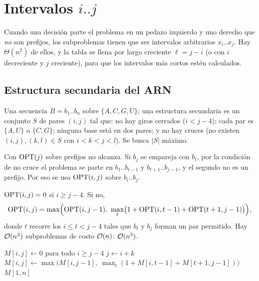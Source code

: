 \section{\texorpdfstring{Intervalos $i..j$}{Intervalos i..j}}\label{pd:sec:intervalos}

Cuando una decisión parte el problema en un pedazo izquierdo y uno derecho
que \emph{no} son prefijos, los subproblemas tienen que ser intervalos
arbitrarios $x_i..x_j$. Hay $\Theta(n^2)$ de ellos, y la tabla se llena por
largo creciente $\ell=j-i$ (o con $i$ decreciente y $j$ creciente), para que
los intervalos más cortos estén calculados.

\subsection{Estructura secundaria del ARN}

Una secuencia $B=b_1..b_n$ sobre $\{A,C,G,U\}$; una estructura secundaria es
un conjunto $S$ de pares $(i,j)$ tal que: no hay giros cerrados ($i<j-4$);
cada par es $\{A,U\}$ o $\{C,G\}$; ninguna base está en dos pares; y no hay
cruces (no existen $(i,j),(k,l)\in S$ con $i<k<j<l$). Se busca $|S|$
máximo.

Con $\mathrm{OPT}(j)$ sobre prefijos no alcanza. Si $b_j$ se empareja con $b_t$, por
la condición de no cruce el problema se parte en $b_1..b_{t-1}$ y
$b_{t+1}..b_{j-1}$, y el segundo no es un prefijo. Por eso se usa
$\mathrm{OPT}(i,j)$ sobre $b_i..b_j$.

\begin{resultado}
$\mathrm{OPT}(i,j)=0$ si $i\ge j-4$. Si no,
\[
\OPT(i,j)=\max\Bigl(\OPT(i,j-1),\ \max_{t}\bigl(1+\OPT(i,t-1)+\OPT(t+1,j-1)\bigr)\Bigr),
\]
donde $t$ recorre los $i\le t<j-4$ tales que $b_t$ y $b_j$ forman un par
permitido. Hay $\mathcal{O}(n^2)$ subproblemas de costo $\mathcal{O}(n)$: $\mathcal{O}(n^3)$.
\end{resultado}

\begin{algorithmic}[1]
\State $M[i,j]\gets0$ para todo $i\ge j-4$
 
    \State $j\gets i+k$
    \State $M[i,j]\gets\max\bigl(M[i,j-1],\ \max_t(1+M[i,t-1]+M[t+1,j-1])\bigr)$
  \EndFor
\EndFor
\State \Return $M[1,n]$
\end{algorithmic}

